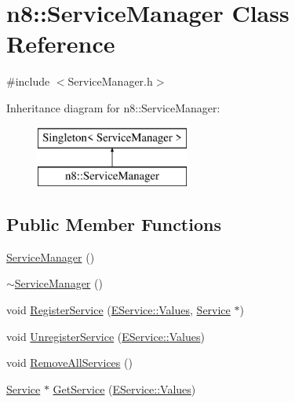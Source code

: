 \hypertarget{classn8_1_1_service_manager}{\section{n8\-:\-:Service\-Manager Class Reference}
\label{classn8_1_1_service_manager}
}


{\ttfamily \#include $<$Service\-Manager.\-h$>$}

Inheritance diagram for n8\-:\-:Service\-Manager\-:\begin{figure}[H]
\begin{center}
\leavevmode
\includegraphics[height=2.000000cm]{classn8_1_1_service_manager}
\end{center}
\end{figure}
\subsection*{Public Member Functions}
\begin{DoxyCompactItemize}
\item 
\hyperlink{classn8_1_1_service_manager_abfe06bc245147f48eca750686d9e1ca0}{Service\-Manager} ()
\item 
\hyperlink{classn8_1_1_service_manager_a329524860b322f5a3ba6ac0b5f909cd8}{$\sim$\-Service\-Manager} ()
\item 
void \hyperlink{classn8_1_1_service_manager_ae3bbc7dc34aa6e747eb301c7935039ab}{Register\-Service} (\hyperlink{namespace_e_service_a7d0bb3de6ea857dc1253fc5a2cef6884}{E\-Service\-::\-Values}, \hyperlink{classn8_1_1_service}{Service} $\ast$)
\item 
void \hyperlink{classn8_1_1_service_manager_a1309152e05c95e60cf98600b9e3053c6}{Unregister\-Service} (\hyperlink{namespace_e_service_a7d0bb3de6ea857dc1253fc5a2cef6884}{E\-Service\-::\-Values})
\item 
void \hyperlink{classn8_1_1_service_manager_a56b16c5856e36f9765029bdbb802bc18}{Remove\-All\-Services} ()
\item 
\hyperlink{classn8_1_1_service}{Service} $\ast$ \hyperlink{classn8_1_1_service_manager_a050b710ab08a641c6562898409afae02}{Get\-Service} (\hyperlink{namespace_e_service_a7d0bb3de6ea857dc1253fc5a2cef6884}{E\-Service\-::\-Values})
\end{DoxyCompactItemize}
